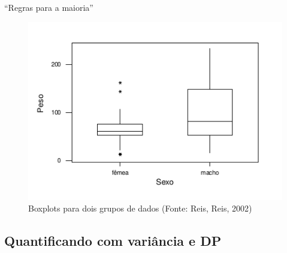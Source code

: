 \documentclass{beamer}
\begin{document}
\begin{frame}{\scriptsize ``Regras para a maioria''}
  \begin{figure}
    \centering
    \includegraphics[height=0.7\textheight]{Cap3/boxplot3}
    \caption{\scriptsize Boxplots para dois grupos de dados (Fonte: Reis, Reis,
      2002)}
  \end{figure}
\end{frame}

\subsection{Quantificando com variância e DP}
\end{document}
